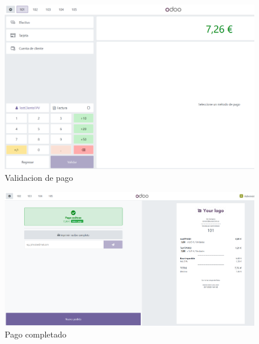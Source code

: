 \documentclass[a4paper,12pt]{article}
\begin{document}
\begin{figure}[h!]
    \centering
    \includegraphics[width=1\textwidth]{pr2odoo58-validacionPago.png}
    \caption{Validacion de pago}
\end{figure}
\FloatBarrier

\begin{figure}[h!]
    \centering
    \includegraphics[width=1\textwidth]{pr2odoo59-pagoCompletado101.png}
    \caption{Pago completado}
\end{figure}
\FloatBarrier
\end{document}
